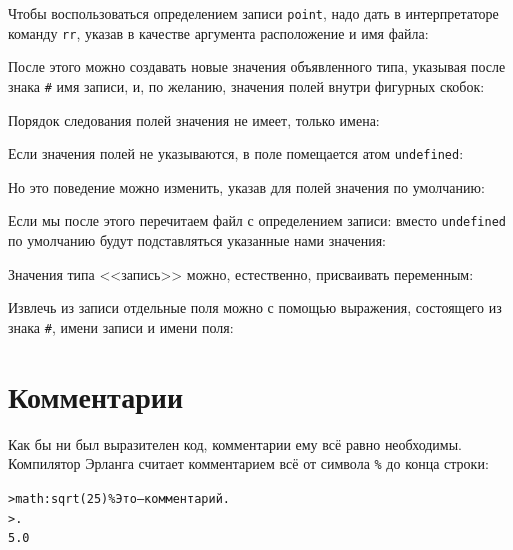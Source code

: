 \documentclass[
  paper=a4,
  fontsize=14pt,
  openany,
  appendixprefix=true
]{scrbook}
\begin{document}
Чтобы воспользоваться определением записи \lstinline{point}, надо дать в интерпретаторе команду \lstinline{rr}, указав в качестве аргумента расположение и имя файла:


После этого можно создавать новые значения объявленного типа, указывая после знака \lstinline{#} имя записи, и, по желанию, значения полей внутри фигурных скобок:


Порядок следования полей значения не имеет, только имена:


Если значения полей не указываются, в поле помещается атом \lstinline{undefined}:


Но это поведение можно изменить, указав для полей значения по умолчанию:



Если мы после этого перечитаем файл с определением записи:
вместо \lstinline{undefined} по умолчанию будут подставляться указанные нами значения:


Значения типа <<запись>> можно, естественно, присваивать переменным:


Извлечь из записи отдельные поля можно с помощью выражения, состоящего из знака \lstinline{#}, имени записи и имени поля:


\section{Комментарии}

Как бы ни был выразителен код, комментарии ему всё равно необходимы. Компилятор Эрланга считает комментарием всё от символа \lstinline{%} до конца строки:
\begin{alltt}
> math:sqrt(25) \% Это --- комментарий.
> .
5.0
\end{alltt}
\addtocounter{erlcommand}{1}
%
\end{document}
